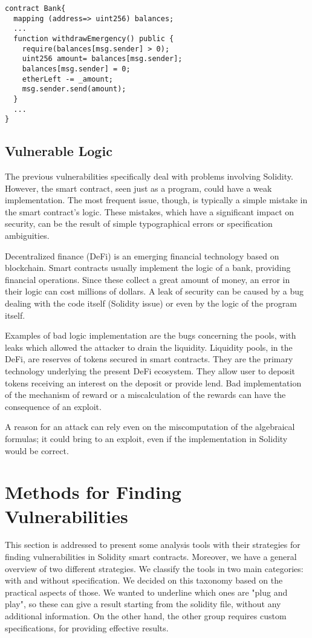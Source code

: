 \documentclass[a4paper,sigconf, language=french,
language=german, language=spanish, language=english]{acmart}
\begin{document}
\begin{lstlisting}[language=Solidity,caption={Unchecked CALL/SEND Return Values},label={lst:UncheckedReturn}]
contract Bank{
  mapping (address=> uint256) balances;
  ... 
  function withdrawEmergency() public {
    require(balances[msg.sender] > 0);
    uint256 amount= balances[msg.sender];
    balances[msg.sender] = 0;
    etherLeft -= _amount;
    msg.sender.send(amount);
  }
  ...
}

\end{lstlisting}

\subsection{Vulnerable Logic}
The previous vulnerabilities specifically deal with problems involving Solidity. However, the smart contract, seen just as a 
program, could have a weak implementation.
The most frequent issue, though, is typically a simple mistake in the smart contract's logic.
These mistakes, which have a significant impact on security, can be the result of simple typographical errors or specification ambiguities. 

Decentralized finance (DeFi) is an emerging financial technology based on blockchain. Smart contracts usually implement the logic of a bank, providing financial operations. Since these collect a great amount of money, an error in their logic can cost millions of dollars. A leak of security can be caused by a bug dealing with the code itself (Solidity issue) or even by the logic of the program itself.  

Examples of bad logic implementation are the bugs concerning the pools, with leaks which allowed the attacker to drain the liquidity.
Liquidity pools, in the DeFi, are reserves of tokens secured in smart contracts. They are the primary technology underlying the present DeFi ecosystem. They allow user to deposit tokens receiving an interest on the deposit or provide lend. Bad implementation of the mechanism of reward or a miscalculation of the rewards can have the consequence of an exploit. 

A reason for an attack can rely even on the miscomputation of the algebraical formulas; it could bring to an exploit, even if the implementation in Solidity would be correct.


\section{Methods for Finding Vulnerabilities}
\label{MethodologiesForTools}
This section is addressed to present some analysis tools with their strategies for finding vulnerabilities in Solidity smart contracts. Moreover, we have a general overview of two different strategies.
We classify the tools in two main categories: with and without specification. 
We decided on this taxonomy based on the practical aspects of those. We wanted to underline which ones are "plug and play", so these can give a result starting from the solidity file, without any additional information. On the other hand, the other group requires custom specifications, for providing effective results.
\end{document}

